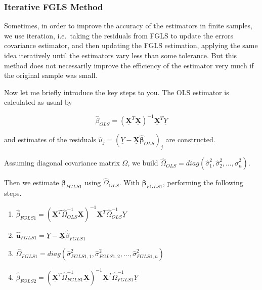 \documentclass[
  12pt,
]{article}
\providecommand{\tightlist}{%
  \setlength{\itemsep}{0pt}\setlength{\parskip}{0pt}}
\begin{document}
\hypertarget{iterative-fgls-method}{%
\subsubsection{Iterative FGLS Method}\label{iterative-fgls-method}}

Sometimes, in order to improve the accuracy of the estimators in finite samples, we use iteration, i.e.~taking the residuals from FGLS to update the errors covariance estimator, and then updating the FGLS estimation, applying the same idea iteratively until the estimators vary less than some tolerance. But this method does not necessarily improve the efficiency of the estimator very much if the original sample was small.

Now let me briefly introduce the key steps to you. The OLS estimator is calculated as usual by

\[
\hat{\beta}_{OLS} = \left(\underline{\mathbf{X}}^{T} \underline{\mathbf{X}} \right)^{-1} \underline{\mathbf{X}}^{T} \underline{Y}
\]

and estimates of the residuals \(\hat{u}_j = (\underline{Y} - \underline{\mathbf{X}} \hat{\mathbf{\beta}}_{OLS})_j\) are constructed.

Assuming diagonal covariance matrix \(\Omega\),
we build \(\hat{\Omega}_{OLS} = diag(\hat{\sigma}^2_1, \hat{\sigma}^2_2, \ldots, \hat{\sigma}^2_n)\).

Then we estimate
\(\mathbf{\beta}_{FGLS1}\) using \(\hat{\Omega}_{OLS}\). With \(\mathbf{\beta}_{FGLS1}\), performing the following steps.

\begin{enumerate}
\def\labelenumi{\arabic{enumi}.}
\tightlist
\item
  \(\hat{\beta}_{FGLS1} = \left(\underline{\mathbf{X}}^{T} \hat{\Omega}^{-1}_{OLS} \underline{\mathbf{X}} \right)^{-1} \underline{\mathbf{X}}^{T} \hat{\Omega}^{-1}_{OLS} \underline{Y}\)
\item
  \(\hat{\mathbf{u}}_{FGLS1} = \underline{Y} - \underline{\mathbf{X}}\hat{\beta}_{FGLS1}\) \label{step2}
\item
  \(\hat{\Omega}_{FGLS1} = diag(\hat{\sigma}^2_{FGLS1,1}, \hat{\sigma}^2_{FGLS1,2}, \dots, \hat{\sigma}^2_{FGLS1,n} )\)
\item
  \(\hat{\beta}_{FGLS2} = \left(\underline{\mathbf{X}}^{T} \hat{\Omega}^{-1}_{FGLS1} \underline{\mathbf{X}} \right)^{-1} \underline{\mathbf{X}}^{T} \hat{\Omega}^{-1}_{FGLS1} \underline{Y}\)
\end{enumerate}
\end{document}
